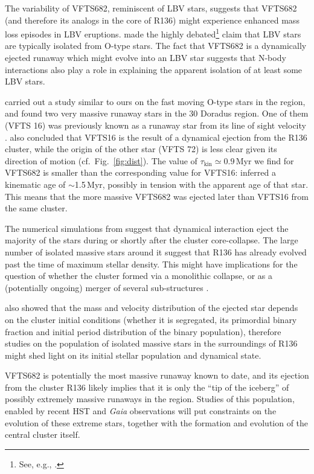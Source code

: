 \documentclass[apjl,twocolumn]{emulateapj}
\DeclareRobustCommand{\Figref}[1]{Fig.~\ref{#1}}
\begin{document}
The variability of VFTS682, reminiscent of LBV stars, suggests
that VFTS682 (and therefore its analogs in the core of R136) might
experience enhanced mass loss episodes in LBV eruptions. \citet{smith:15} made the highly
debated\footnote{See, e.g., \cite{humphreys:16, davidson:16, smith:16}.}
claim that LBV stars are typically isolated from O-type stars. The fact that VFTS682 is a dynamically
ejected runaway which might evolve into an LBV star suggests that
N-body interactions also play a role in explaining the apparent
isolation of at least some LBV stars. 


\citet{lennon:18} carried out a study similar to ours on the fast
moving O-type stars
in the region, and found two very massive runaway stars in the 30 Doradus region. One of them (VFTS 16)
was previously known as a runaway star from its line of sight velocity
\citep[][]{evans:10}. \citet{lennon:18} also concluded that VFTS16 is 
the result of a dynamical ejection from the R136 cluster, while the
origin of the other star (VFTS 72) is less clear given its direction
of motion (cf.~\Figref{fig:dist}). The value of $\tau_\mathrm{kin}\simeq0.9$\,Myr we find for
VFTS682 is smaller than the
corresponding value for VFTS16: \cite{lennon:18} inferred a kinematic
age of $\sim$1.5\,Myr, possibly in tension with the apparent age of that star. This means that the more
massive VFTS682 was ejected later than VFTS16 from the same cluster.

The numerical simulations from \cite{oh:16} suggest that dynamical
interaction eject the majority of the stars during or shortly after the cluster
core-collapse. The large number of isolated massive stars around it
suggest that R136 has already evolved past the
time of maximum stellar density. This might have implications for the
question of whether the cluster formed via a monolithic collapse, or
as a (potentially ongoing) merger of several sub-structures \citep[e.g.,][]{sabbi:12}.

\citet{oh:16} also showed that the mass and velocity distribution of the ejected star depends on the cluster initial conditions
(whether it is segregated, its primordial binary fraction and initial period
distribution of the binary population), therefore studies on
the population of isolated massive stars in the surroundings of R136
might shed light on its initial stellar population and dynamical
state. 

VFTS682 is potentially the most massive runaway known to date, and its ejection
from the cluster R136 likely implies that it is only the ``tip of the
iceberg'' of possibly extremely massive runaways in the
region. Studies of this population, enabled by recent HST and \emph{Gaia} observations will put constraints on the evolution
of these extreme stars, together with the formation and evolution of
the central cluster itself.
\end{document}
